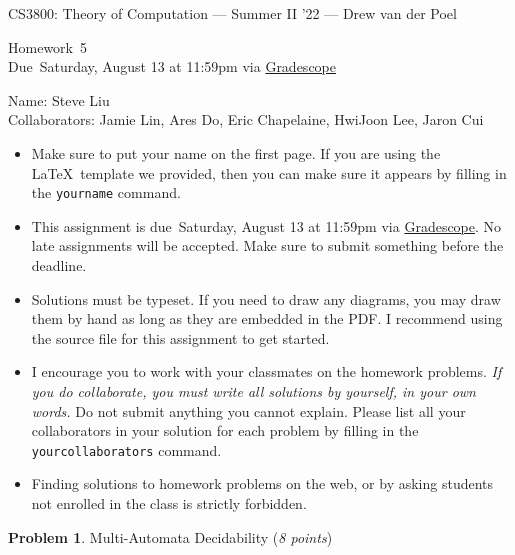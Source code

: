 \documentclass[11pt]{article}
\newcommand{\yourname}{}
\newcommand{\yourcollaborators}{}
\theoremstyle{definition}
\newcommand{\instructor}{Drew van der Poel}
\newcommand{\hwnum}{5}
\newcommand{\hwdue}{Saturday, August 13 at 11:59pm via \href{https://www.gradescope.com/courses/406943}{Gradescope}}
\theoremstyle{theorem}
\newtheorem{prob}{Problem}
\begin{document}
{\Large 
\begin{center}{CS3800: Theory of Computation} --- Summer II '22 --- \instructor \end{center}}
{\large
\vspace{10pt}
\noindent Homework~\hwnum \vspace{2pt}\\
Due~\hwdue}

\bigskip
{\large
\noindent Name: Steve Liu \yourname \vspace{2pt}\\ Collaborators: Jamie Lin, Ares Do, Eric Chapelaine, HwiJoon Lee, Jaron Cui \yourcollaborators}

\vspace{15pt}
\begin{itemize}

\item Make sure to put your name on the first page.  If you are using the \LaTeX~template we provided, then you can make sure it appears by filling in the \texttt{yourname} command.

\item This assignment is due~\hwdue.  No late assignments will be accepted.  Make sure to submit something before the deadline.

\item Solutions must be typeset.  If you need to draw any diagrams, you may draw them by hand as long as they are embedded in the PDF.  I recommend using the source file for this assignment to get started.

\item I encourage you to work with your classmates on the homework problems. \emph{If you do collaborate, you must write all solutions by yourself, in your own words.}  Do not submit anything you cannot explain.  Please list all your collaborators in your solution for each problem by filling in the \texttt{yourcollaborators} command.

\item Finding solutions to homework problems on the web, or by asking students not enrolled in the class is strictly forbidden.

\end{itemize}




\newpage

\begin{prob} Multi-Automata Decidability (\emph{8 points})\end{prob}
\end{document}
